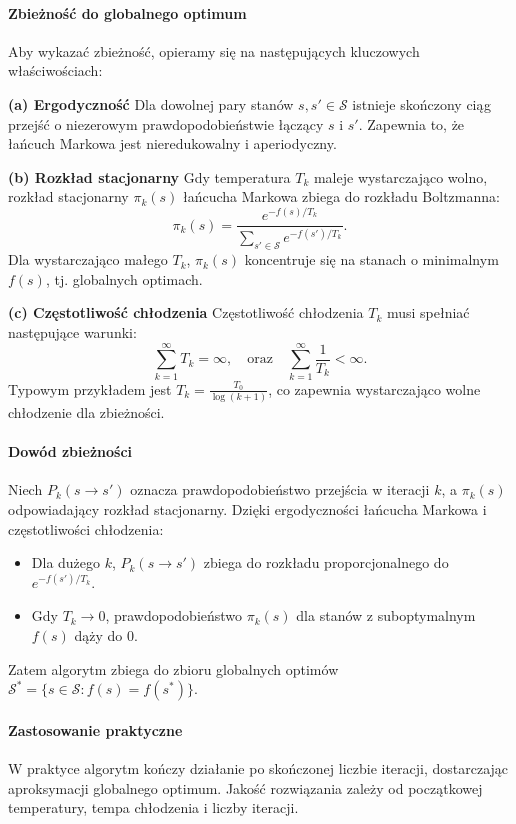 \paragraph{Zbieżność do globalnego optimum}
Aby wykazać zbieżność, opieramy się na następujących kluczowych właściwościach:

\textbf{(a) Ergodyczność}
Dla dowolnej pary stanów $s, s' \in \mathcal{S}$ istnieje skończony ciąg przejść o niezerowym prawdopodobieństwie łączący $s$ i $s'$. Zapewnia to, że łańcuch Markowa jest nieredukowalny i aperiodyczny.

\textbf{(b) Rozkład stacjonarny}
Gdy temperatura $T_k$ maleje wystarczająco wolno, rozkład stacjonarny $\pi_k(s)$ łańcucha Markowa zbiega do rozkładu Boltzmanna:
\[
    \pi_k(s) = \frac{e^{-f(s) / T_k}}{\sum_{s' \in \mathcal{S}} e^{-f(s') / T_k}}.
\]
Dla wystarczająco małego $T_k$, $\pi_k(s)$ koncentruje się na stanach o minimalnym $f(s)$, tj. globalnych optimach.

\textbf{(c) Częstotliwość chłodzenia}
Częstotliwość chłodzenia $T_k$ musi spełniać następujące warunki:
\[
    \sum_{k=1}^\infty T_k = \infty, \quad \text{oraz} \quad \sum_{k=1}^\infty \frac{1}{T_k} < \infty.
\]
Typowym przykładem jest $T_k = \frac{T_0}{\log(k+1)}$, co zapewnia wystarczająco wolne chłodzenie dla zbieżności.

\paragraph{Dowód zbieżności}
Niech $P_k(s \to s')$ oznacza prawdopodobieństwo przejścia w iteracji $k$, a $\pi_k(s)$ odpowiadający rozkład stacjonarny. Dzięki ergodyczności łańcucha Markowa i częstotliwości chłodzenia:
\begin{itemize}
    \item Dla dużego $k$, $P_k(s \to s')$ zbiega do rozkładu proporcjonalnego do $e^{-f(s') / T_k}$.
    \item Gdy $T_k \to 0$, prawdopodobieństwo $\pi_k(s)$ dla stanów z suboptymalnym $f(s)$ dąży do $0$.
\end{itemize}
Zatem algorytm zbiega do zbioru globalnych optimów $\mathcal{S}^* = \{s \in \mathcal{S} : f(s) = f(s^*)\}$.

\paragraph{Zastosowanie praktyczne}
W praktyce algorytm kończy działanie po skończonej liczbie iteracji, dostarczając aproksymacji globalnego optimum. Jakość rozwiązania zależy od początkowej temperatury, tempa chłodzenia i liczby iteracji.

